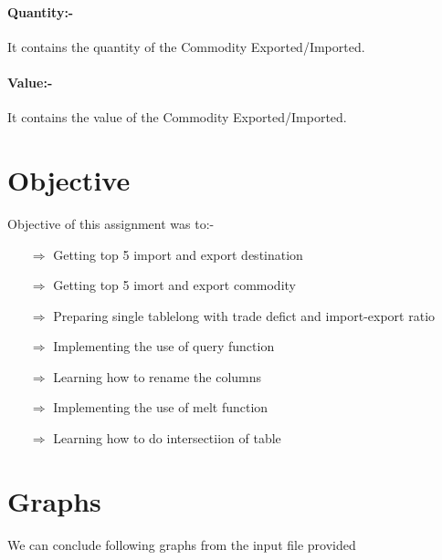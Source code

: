 \documentclass[a4paper,11pt]{article}
\begin{document}
\paragraph{Quantity:-} It contains the quantity of the Commodity Exported/Imported.
\paragraph{Value:-} It contains the value of the Commodity Exported/Imported.

\section{Objective}				%
\label{sec:obj}
Objective of this assignment was to:-
\begin{itemize}
\item[$\Rightarrow$] Getting top 5 import and export destination
\item[$\Rightarrow$] Getting top 5 imort and export commodity
\item[$\Rightarrow$] Preparing single tablelong with trade defict and import-export ratio
\item[$\Rightarrow$] Implementing the use of query function
\item[$\Rightarrow$] Learning how to rename the columns
\item[$\Rightarrow$] Implementing the use of melt function
\item[$\Rightarrow$] Learning how to do intersectiion of table
\end{itemize}



\section{Graphs}					%
\label{sec:gra}
We can conclude following graphs from the input file provided
\end{document}
